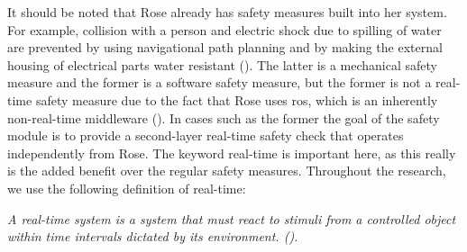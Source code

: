 \documentclass[12pt]{scrreprt}
\begin{document}
 
It should be noted that Rose already has safety measures built into her system. For example, collision with a person and electric shock due to spilling of water are prevented by using navigational path planning and by making the external housing of electrical parts water resistant (\cite{risk_analysis}). The latter is a mechanical safety measure and the former is a software safety measure, but the former is not a real-time safety measure due to the fact that Rose uses \acrfull{ros}, which is an inherently non-real-time middleware (\cite{why_is_ros_not_realtime}). In cases such as the former the goal of the safety module is to provide a second-layer real-time safety check that operates independently from Rose. The keyword real-time is important here, as this really is the added benefit over the regular safety measures. Throughout the research, we use the following definition of real-time: 

\begin{flushleft}
\textit{
A real-time system is a system that must react to stimuli from a controlled object within time intervals dictated by its environment. (\cite{realtime_systems}).
}
\end{flushleft}
\end{document}

